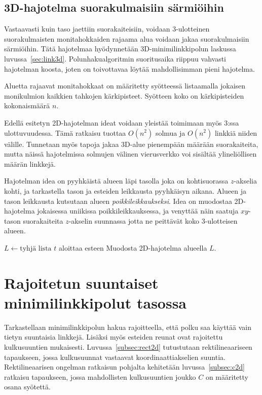 \documentclass[finnish]{tktltiki2}
\theoremstyle{definition}
\theoremstyle{remark}
\begin{document}
\subsection{3D-hajotelma suorakulmaisiin särmiöihin}

Vastaavasti kuin taso jaettiin suorakaiteisiin, voidaan 3-ulotteinen suorakulmaisten monitahokkaiden rajaama alua voidaan jakaa suorakulmaisiin särmiöihin.
Tätä hajotelmaa hyödynnetään 3D-minimilinkkipolun laskussa luvussa~\ref{sec:link3d}.
Polunhakualgoritmin suoritusaika riippuu vahvasti hajotelman koosta, joten on toivottavaa löytää mahdollisimman pieni hajotelma.

Aluetta rajaavat monitahokkaat on määritetty syötteessä listaamalla jokaisen monikulmion kaikkien tahkojen kärkipisteet.
Syötteen koko on kärkipisteiden kokonaismäärä $n$.

Edellä esitetyn 2D-hajotelman ideat voidaan yleistää toimimaan myös 3:ssa ulottuvuudessa.
Tämä ratkaisu tuottaa $O(n^2)$ solmua ja $O(n^2)$ linkkiä niiden välille.
Tunnetaan myös tapoja jakaa 3D-alue pienempään määrään suorakaiteita, mutta näissä hajotelmissa solmujen välinen vierusverkko voi sisältää ylineliöllisen määrän linkkejä.

Hajotelman idea on pyyhkäistä alueen läpi tasolla joka on kohtisuorassa $z$-akselia kohti, ja tarkastella tason ja esteiden leikkausta pyyhkäisyn aikana.
Alueen ja tason leikkausta kutsutaan alueen \emph{poikkileikkaukseksi}.
Idea on muodostaa 2D-hajotelma jokaisessa uniikissa poikkileikkauksessa, ja venyttää näin saatuja $xy$-tason suorakaiteita $z$-akselin suunnassa jotta ne peittävät koko 3-ulotteisen alueen.

\begin{algorithmic}\label{jako3d}
\State $L \gets \text{tyhjä lista}$
	\If $t$ aloittaa esteen
	\Else
	\EndIf
	\State Muodosta 2D-hajotelma alueella $L$.
\EndFor
\end{algorithmic}



\section{Rajoitetun suuntaiset minimilinkkipolut tasossa}\label{sec:limited2d}

Tarkastellaan minimilinkkipolun hakua rajoitteella, että polku saa käyttää vain tietyn suuntaisia linkkejä.
Lisäksi myös esteiden reunat ovat rajoitettu kulkusuuntien mukaisesti.
Luvussa~\ref{subsec:rect2d} tutustutaan rektilineaariseen tapaukseen, jossa kulkusuunnat vastaavat koordinaattiakselien suuntia.
Rektilineaarisen ongelman ratkaisun pohjalta kehitetään luvussa~\ref{subsec:c2d} ratkaisu tapaukseen, jossa mahdollisten kulkusuuntien joukko $C$ on määritetty osana syötettä.
\end{document}
